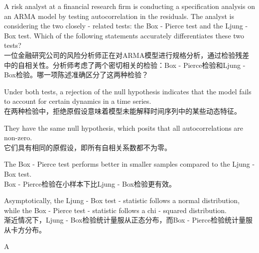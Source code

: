 \documentclass{article}
\newcounter{question} %
\begin{document}
    \begin{question}
        A risk analyst at a financial research firm is conducting a specification analysis on an ARMA model by testing autocorrelation in the residuals. The analyst is considering the two closely - related tests: the Box - Pierce test and the Ljung - Box test. Which of the following statements accurately differentiates these two tests?\\
        一位金融研究公司的风险分析师正在对ARMA模型进行规格分析，通过检验残差中的自相关性。分析师考虑了两个密切相关的检验：Box - Pierce检验和Ljung - Box检验。哪一项陈述准确区分了这两种检验？
        \end{question}
        
        \begin{choices}
            \item Under both tests, a rejection of the null hypothesis indicates that the model fails to account for certain dynamics in a time series.\\
            在两种检验中，拒绝原假设意味着模型未能解释时间序列中的某些动态特征。
            \item They have the same null hypothesis, which posits that all autocorrelations are non-zero.\\
            它们具有相同的原假设，即所有自相关系数都不为零。
            \item The Box - Pierce test performs better in smaller samples compared to the Ljung - Box test.
            \\Box - Pierce检验在小样本下比Ljung - Box检验更有效。
            \item Asymptotically, the Ljung - Box test - statistic follows a normal distribution, while the Box - Pierce test - statistic follows a chi - squared distribution.\\
            渐近情况下，Ljung - Box检验统计量服从正态分布，而Box - Pierce检验统计量服从卡方分布。
        \end{choices}
        
        \begin{correctanswer}
            A
        \end{correctanswer}
        
\end{document}
